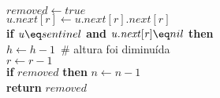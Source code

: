 \documentclass{beamer}
\begin{document}
\begin{frame}[shrink]
\begin{oframed}
\begin{flushleft}
\hspace*{1em} \hspace*{1em} \hspace*{1em} \hspace*{1em} \ensuremath{\ensuremath{\mathit{removed}} \gets  \ensuremath{\ensuremath{\mathit{true}}}}\\
\hspace*{1em} \hspace*{1em} \hspace*{1em} \hspace*{1em} \ensuremath{\ensuremath{\mathit{u}}.\ensuremath{\ensuremath{\mathit{next}}[\ensuremath{\mathit{r}}]} \gets  \ensuremath{\ensuremath{\mathit{u}}.\ensuremath{\mathit{next}}[\ensuremath{\mathit{r}}].\ensuremath{\mathit{next}}[\ensuremath{\mathit{r}}]}}\\
\hspace*{1em} \hspace*{1em} \hspace*{1em} \hspace*{1em} {\color{black} \textbf{if}} \ensuremath{\ensuremath{\mathit{u}} \eq sentinel} {\color{black} \textbf{and}} \ensuremath{\ensuremath{\mathit{u}}.\ensuremath{\mathit{next}}[\ensuremath{\mathit{r}}] \eq nil} {\color{black} \textbf{then}} \\
\hspace*{1em} \hspace*{1em} \hspace*{1em} \hspace*{1em} \hspace*{1em} \ensuremath{\ensuremath{\mathit{h}} \gets  \ensuremath{\ensuremath{\mathit{h}} - 1} }\ {\color{blue}\# altura foi diminuída}\\
\hspace*{1em} \hspace*{1em} \hspace*{1em} \ensuremath{\ensuremath{\mathit{r}} \gets  \ensuremath{\ensuremath{\mathit{r}} - 1}}\\
\hspace*{1em} \hspace*{1em} {\color{black} \textbf{if}} \ensuremath{removed} {\color{black} \textbf{then}}  \ensuremath{\ensuremath{\mathit{n}} \gets  \ensuremath{\ensuremath{\mathit{n}} - 1}}\\
\hspace*{1em} \hspace*{1em} {\color{black} \textbf{return}} \ensuremath{removed}\hspace*{1em} \\
\end{flushleft}
\end{oframed}
\end{frame}
\end{document}
